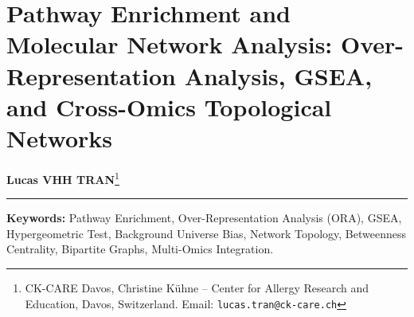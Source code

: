 \documentclass[11pt,twoside,openright]{book}
\begin{document}
\setcounter{chapter}{24} %
\chapter{Pathway Enrichment and Molecular Network Analysis: Over-Representation Analysis, GSEA, and Cross-Omics Topological Networks}
\label{ch:pathway_network}

\noindent
\textbf{Lucas VHH TRAN}\footnote{CK-CARE Davos, Christine K\"uhne -- Center for Allergy Research and Education, Davos, Switzerland. Email: \texttt{lucas.tran@ck-care.ch}}\\
\rule{\textwidth}{0.8pt}

\begin{abstract}
\noindent
High-resolution mass spectrometry experiments frequently culminate in ranked lists of hundreds of differentially abundant peptides, proteins, or metabolites. However, an uncurated feature list does not provide mechanistic clarity: cellular phenotype is mediated not by isolated molecules, but by coordinated fluxes through metabolic cascades, multi-protein complexes, and signaling cascades. Bridging physical mass spectra to biological insight requires functional enrichment and molecular network analysis. 

This chapter establishes the statistical, topological, and computational foundations for pathway-level inference in proteomics and metabolomics. We develop the mathematical framework of Over-Representation Analysis (ORA) via the hypergeometric distribution, Fisher's exact test, and non-central Wallenius formulations, deriving an analytical proof demonstrating why using the whole genome rather than the empirically detected mass spectrometry background creates massive false-positive inflation. We formalize functional class scoring via Gene Set Enrichment Analysis (GSEA), deriving the weighted Kolmogorov-Smirnov running-sum statistic, normalized enrichment score (NES), and permutation testing. We then transition to graph-theoretic network biology, formalizing adjacency matrices, degree and betweenness centrality, random walk with restart (RWR), and Louvain community detection. Finally, we formulate bipartite cross-omics network integration between proteomics and metabolomics, supported by an end-to-end reproducible R laboratory, a review of the ``Five Deadly Sins'' of omics pathway analysis, and multi-tier exercises with complete worked solutions.
\end{abstract}

\noindent\textbf{Keywords:} Pathway Enrichment, Over-Representation Analysis (ORA), GSEA, Hypergeometric Test, Background Universe Bias, Network Topology, Betweenness Centrality, Bipartite Graphs, Multi-Omics Integration.
\end{document}
